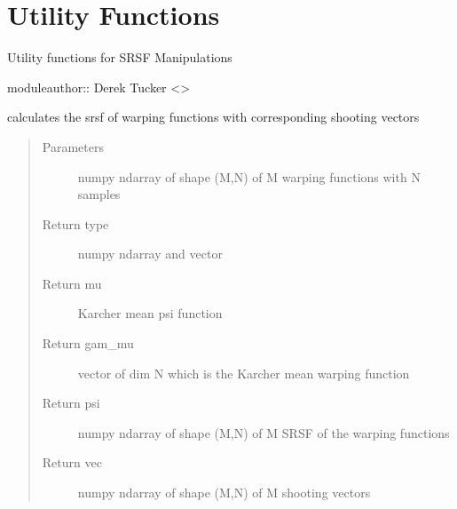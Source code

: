 \documentclass[letterpaper,10pt,english]{sphinxmanual}
\begin{document}
\chapter{Utility Functions}
\label{\detokenize{utility_functions:module-utility_functions}}\label{\detokenize{utility_functions:utility-functions}}\label{\detokenize{utility_functions::doc}}
Utility functions for SRSF Manipulations

moduleauthor:: Derek Tucker \textless{}\textgreater{}

\begin{fulllineitems}
\label{\detokenize{utility_functions:utility_functions.SqrtMean}}
calculates the srsf of warping functions with corresponding shooting vectors
\begin{quote}\begin{description}
\item[{Parameters}] \leavevmode
{} \textendash{} numpy ndarray of shape (M,N) of M warping functions
with N samples

\item[{Return type}]  numpy ndarray and vector

\item[{Return mu}] \leavevmode
Karcher mean psi function

\item[{Return gam\_mu}] \leavevmode
vector of dim N which is the Karcher mean warping function

\item[{Return psi}] \leavevmode
numpy ndarray of shape (M,N) of M SRSF of the warping functions

\item[{Return vec}] \leavevmode
numpy ndarray of shape (M,N) of M shooting vectors

\end{description}\end{quote}

\end{fulllineitems}

\end{document}
